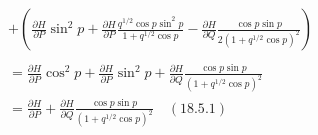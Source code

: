 \documentclass[a4paper]{article}
\begin{document}
\begin{answer}[Punto 4]
\begin{itemize}
\begin{align*}
                &+ \left(\frac{\partial H}{\partial P} \sin^2 p + \frac{\partial H}{\partial P}\frac{q^{1/2} \cos p \sin^2 p}{1 + q^{1/2} \cos p}  -\frac{\partial H}{\partial Q} \frac{\cos p \sin p}{2(1  + q^{1/2} \cos p)^2} \right)\\\\
                &= \frac{\partial H}{\partial P} \cos^2 p + \frac{\partial H}{\partial P} \sin^2 p + \frac{\partial H}{\partial Q} \frac{\cos p \sin p}{(1  + q^{1/2} \cos p)^2} \\
                &= \frac{\partial H}{\partial P} + \frac{\partial H}{\partial Q} \frac{\cos p \sin p}{(1  + q^{1/2} \cos p)^2} \quad (18.5.1)\\
            \end{align*}



           
        \end{itemize}
    \end{answer}
    
\end{document}
